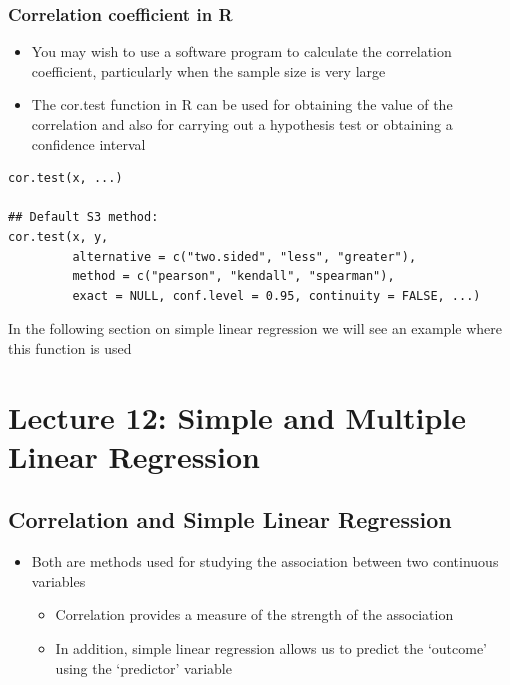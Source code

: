 \documentclass[
]{book}
\providecommand{\tightlist}{%
  \setlength{\itemsep}{0pt}\setlength{\parskip}{0pt}}
\begin{document}
\hypertarget{correlation-coefficient-in-r}{%
\subsection{Correlation coefficient in R}\label{correlation-coefficient-in-r}}

\begin{itemize}
\tightlist
\item
  You may wish to use a software program to calculate the correlation coefficient, particularly when the sample size is very large
\item
  The cor.test function in R can be used for obtaining the value of the correlation and also for carrying out a hypothesis test or obtaining a confidence interval
\end{itemize}

\begin{verbatim}
cor.test(x, ...)

## Default S3 method:
cor.test(x, y,
         alternative = c("two.sided", "less", "greater"),
         method = c("pearson", "kendall", "spearman"),
         exact = NULL, conf.level = 0.95, continuity = FALSE, ...)
\end{verbatim}

In the following section on simple linear regression we will see an example where this function is used

\hypertarget{lecture-12-simple-and-multiple-linear-regression}{%
\chapter{Lecture 12: Simple and Multiple Linear Regression}\label{lecture-12-simple-and-multiple-linear-regression}}

\hypertarget{correlation-and-simple-linear-regression}{%
\section{Correlation and Simple Linear Regression}\label{correlation-and-simple-linear-regression}}

\begin{itemize}
\tightlist
\item
  Both are methods used for studying the association between two continuous variables

  \begin{itemize}
  \tightlist
  \item
    Correlation provides a measure of the strength of the association
  \item
    In addition, simple linear regression allows us to predict the `outcome' using the `predictor' variable
  \end{itemize}
\end{itemize}
\end{document}
